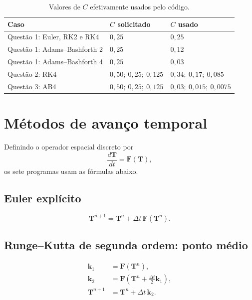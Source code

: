 \documentclass[12pt,a4paper]{article}
\newcommand{\toprule}{\hline}
\newcommand{\midrule}{\hline}
\newcommand{\bottomrule}{\hline}
\begin{document}
\begin{table}[htbp]
\centering
\caption{Valores de $C$ efetivamente usados pelo código.}
\label{tab:c_usados}
\begin{tabular}{lll}
\toprule
Caso & $C$ solicitado & $C$ usado \\
\midrule
Questão 1: Euler, RK2 e RK4 & $0{,}25$ & $0{,}25$ \\
Questão 1: Adams--Bashforth 2 & $0{,}25$ & $0{,}12$ \\
Questão 1: Adams--Bashforth 4 & $0{,}25$ & $0{,}03$ \\
Questão 2: RK4 & $0{,}50;\ 0{,}25;\ 0{,}125$ & $0{,}34;\ 0{,}17;\ 0{,}085$ \\
Questão 3: AB4 & $0{,}50;\ 0{,}25;\ 0{,}125$ & $0{,}03;\ 0{,}015;\ 0{,}0075$ \\
\bottomrule
\end{tabular}
\end{table}

\section{Métodos de avanço temporal}

Definindo o operador espacial discreto por
\begin{equation}
    \frac{d\mathbf{T}}{dt}=\mathbf{F}(\mathbf{T}),
\end{equation}
os sete programas usam as fórmulas abaixo.

\subsection{Euler explícito}
\begin{equation}
    \mathbf{T}^{n+1}
    =
    \mathbf{T}^{n}
    +
    \Delta t\,\mathbf{F}(\mathbf{T}^{n}).
\end{equation}

\subsection{Runge--Kutta de segunda ordem: ponto médio}
\begin{align}
    \mathbf{k}_1 &= \mathbf{F}(\mathbf{T}^{n}),\\
    \mathbf{k}_2 &= \mathbf{F}\left(\mathbf{T}^{n}
        +\frac{\Delta t}{2}\mathbf{k}_1\right),\\
    \mathbf{T}^{n+1} &= \mathbf{T}^{n}+\Delta t\,\mathbf{k}_2.
\end{align}
\end{document}
